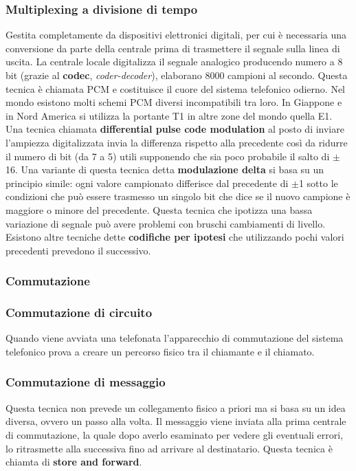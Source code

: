 \subsubsection*{Multiplexing a divisione di tempo}

Gestita completamente da dispositivi elettronici digitali, per cui è necessaria una conversione da parte della centrale prima di trasmettere il segnale sulla linea di uscita. La centrale locale digitalizza il segnale analogico producendo numero a 8 bit (grazie al \textbf{codec}, \textit{coder-decoder}), elaborano  8000 campioni al secondo. Questa tecnica è chiamata PCM e costituisce il cuore del sistema telefonico odierno. Nel mondo esistono molti schemi PCM diversi incompatibili tra loro. In Giappone e in Nord America si utilizza la portante T1 in altre zone del mondo quella E1. Una tecnica chiamata \textbf{differential pulse code modulation} al posto di inviare l'ampiezza digitalizzata invia la differenza rispetto alla precedente così da ridurre il numero di bit (da 7 a 5) utili supponendo che sia poco probabile il salto di \(\pm\)16. Una variante di questa tecnica detta \textbf{modulazione delta} si basa su un principio simile: ogni valore campionato differisce dal precedente di \(\pm\)1 sotto le condizioni che può essere trasmesso un singolo bit che dice se il nuovo campione è maggiore o minore del precedente. Questa tecnica che ipotizza una bassa variazione di segnale può avere problemi con bruschi cambiamenti di livello. Esistono altre tecniche dette \textbf{codifiche per ipotesi} che utilizzando pochi valori precedenti prevedono il successivo.

\subsubsection{Commutazione}

\subsubsection*{Commutazione di circuito}

Quando viene avviata una telefonata l'apparecchio di commutazione del sistema telefonico prova a creare un percorso fisico tra il chiamante e il chiamato. 

\subsubsection*{Commutazione di messaggio}

Questa tecnica non prevede un collegamento fisico a priori ma si basa su un idea diversa, ovvero un passo alla volta. Il messaggio viene inviata alla prima centrale di commutazione, la quale dopo averlo esaminato per vedere gli eventuali errori, lo ritrasmette alla successiva fino ad arrivare al destinatario. Questa tecnica è chiamta di \textbf{store and forward}.

